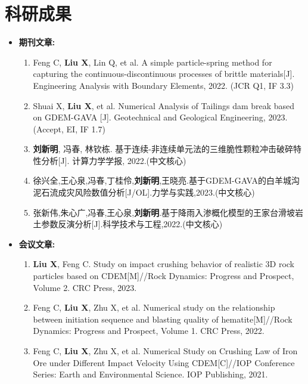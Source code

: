 \documentclass[a4paper,12pt]{extarticle}
\begin{document}
\section*{科研成果}
\begin{itemize}
    \item \textbf{期刊文章:}  %
    \begin{enumerate}
    \item Feng C, \textbf{Liu X}, Lin Q, et al. A simple particle-spring method for capturing the continuous-discontinuous processes of brittle materials[J]. Engineering Analysis with Boundary Elements, 2022. (JCR Q1, IF 3.3)
    \item Shuai X, \textbf{Liu X}, et al. Numerical Analysis of Tailings dam break based on GDEM-GAVA [J]. Geotechnical and Geological Engineering, 2023. (Accept, EI, IF 1.7)
    \item \textbf{刘新明}, 冯春, 林钦栋. 基于连续-非连续单元法的三维脆性颗粒冲击破碎特性分析[J]. 计算力学学报, 2022.(中文核心)
    \item 徐兴全,王心泉,冯春,丁桂伶,\textbf{刘新明},王晓亮.基于GDEM-GAVA的白羊城沟泥石流成灾风险数值分析[J/OL].力学与实践,2023.(中文核心)
    \item 张新伟,朱心广,冯春,王心泉,\textbf{刘新明}.基于降雨入渗概化模型的王家台滑坡岩土参数反演分析[J].科学技术与工程,2022.(中文核心) 
\end{enumerate}
\end{itemize}

\begin{itemize}
    \item \textbf{会议文章:} %
    \begin{enumerate}
    \item \textbf{Liu X}, Feng C. Study on impact crushing behavior of realistic 3D rock particles based on CDEM[M]//Rock Dynamics: Progress and Prospect, Volume 2. CRC Press, 2023.
    \item Feng C, \textbf{Liu X}, Zhu X, et al. Numerical study on the relationship between initiation sequence and blasting quality of hematite[M]//Rock Dynamics: Progress and Prospect, Volume 1. CRC Press, 2022.
    \item Feng C, \textbf{Liu X}, Zhu X, et al. Numerical Study on Crushing Law of Iron Ore under Different Impact Velocity Using CDEM[C]//IOP Conference Series: Earth and Environmental Science. IOP Publishing, 2021.
\end{enumerate}
\end{itemize}
\end{document}
